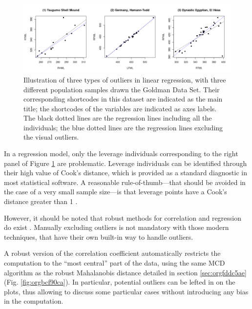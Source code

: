 \documentclass[review, 3p]{elsarticle}
\begin{document}
\begin{figure}[htbp]
\centering
\includegraphics[width=\textwidth]{figures/type_outliers_reg.png}
\caption{\label{fig:org2655a96}Illustration of three types of outliers in linear regression, with three different population samples drawn the Goldman Data Set. Their corresponding shortcodes in this dataset are indicated as the main title; the shortcodes of the variables are indicated as axes labels. The black dotted lines are the regression lines including all the individuals; the blue dotted lines are the regression lines excluding the visual outliers.}
\end{figure}

In a regression model, only the leverage individuals corresponding to the right panel of Figure \ref{fig:org2655a96} are problematic. Leverage individuals can be identified through their high value of Cook's distance, which is provided as a standard diagnostic in most statistical software. A reasonable rule-of-thumb---that should be avoided in the case of a very small sample size---is that leverage points have a Cook's distance greater than 1 \citep{cornillon2010_RegressionAvec}.

However, it should be noted that robust methods for correlation and regression do exist \citep{rousseeuw1987_RobustRegressionOutlier}. Manually excluding outliers is not mandatory with those modern techniques, that have their own built-in way to handle outliers. 

A robust version of the correlation coefficient automatically restricts the computation to the ``most central'' part of the data, using the same MCD algorithm as the robust Mahalanobis distance detailed in section \ref{sec:orgfddc5ae} (Fig. \ref{fig:orgbcf90ca}). In particular, potential outliers can be lefted in on the plots, thus allowing to discuss some particular cases without introducing any bias in the computation.
\end{document}

